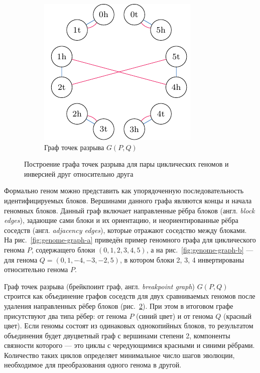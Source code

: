 \begin{figure}[h!]
    \begin{subfigure}[b]{0.42\textwidth}
        \centering
        \includegraphics[width=\linewidth]{images/part1/genome-graph-pq2.pdf}
        \caption{Граф точек разрыва $G(P,Q)$}
        \label{fig:genome-graph-c}
    \end{subfigure}
    
    \caption{Построение графа точек разрыва для пары циклических геномов и инверсией друг относительно друга}
\end{figure}

Формально геном можно представить как упорядоченную последовательность идентифицируемых блоков. 
Вершинами данного графа являются концы и начала геномных блоков.
Данный граф включает направленные рёбра блоков (англ. \textit{block edges}), задающие сами блоки и их ориентацию, и неориентированные рёбра соседств (англ. \textit{adjacency edges}), которые отражают соседство между блоками.
На рис.~\ref{fig:genome-graph-a} приведён пример геномного графа для циклического генома $P$, содержащего блоки $(0, 1, 2, 3, 4, 5)$, а на рис.~\ref{fig:genome-graph-b} — для генома $Q = (0, 1, -4, -3, -2, 5)$, в котором блоки 2, 3, 4 инвертированы относительно генома $P$.

Граф точек разрыва (брейкпоинт граф, англ. \textit{breakpoint graph}) $G(P,Q)$ строится как объединение графов соседств для двух сравниваемых геномов после удаления направленных рёбер блоков (рис.~\ref{fig:genome-graph-c}).
При этом в итоговом графе присутствуют два типа рёбер: от генома $P$ (синий цвет) и от генома $Q$ (красный цвет).
Если геномы состоят из одинаковых однокопийных блоков, то результатом объединения будет двуцветный граф с вершинами степени 2, компоненты связности которого — это циклы с чередующимися красными и синими рёбрами.
Количество таких циклов определяет минимальное число шагов эволюции, необходимое для преобразования одного генома в другой.

